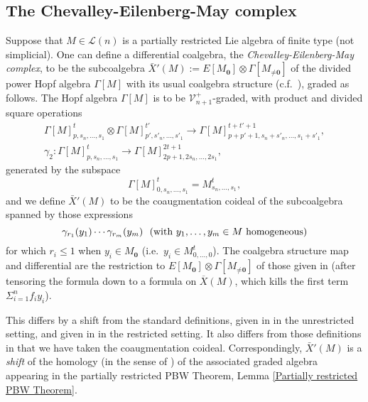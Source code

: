 \documentclass[11pt]{amsart} \renewcommand{\baselinestretch}{1.2}
\theoremstyle{plain}
\theoremstyle{definition}
\renewcommand{\to}{\longrightarrow}
\newcommand{\calL}{\mathcal{L}}
\newcommand{\calV}{\mathcal{V}}
\newcommand{\citeBOX}[2][]{\cite[\mbox{#1}]{#2}}
\newcommand{\vect}[2]{\calV^{#1}_{#2}}
\newcommand{\UEAX}{\bar{X}'}%
\begin{document}
\begin{appendices}
\subsection{The Chevalley-Eilenberg-May complex}
\label{The Chevalley-Eilenberg-May complex}
Suppose that $M\in\calL(n)$ is a partially restricted Lie algebra of finite type (not simplicial). One can define a differential coalgebra, the \emph{Chevalley-Eilenberg-May complex}, to be the subcoalgebra $\UEAX(M):= E[M_{\textbf{0}}]\otimes \Gamma[M_{\neq\textbf{0}}]$ of the divided power Hopf algebra $\Gamma[M]$ with its usual coalgebra structure (c.f.\ \citeBOX[p.~141]{MayRestLie.pdf}), graded as follows. 
The Hopf algebra $\Gamma[M]$ is to be $\vect{+}{n+1}$-graded, with product and divided square operations
\begin{gather*}
\Gamma[M]_{p,s_n,\ldots,s_1}^{t}\otimes \Gamma[M]_{p',s'_n,\ldots,s'_1}^{t'}\to \Gamma[M]_{p+p'+1,s_n+s'_n,\ldots,s_1+s'_1}^{t+t'+1},
\\
\gamma_2:\Gamma[M]_{p,s_n,\ldots,s_1}^{t}\to \Gamma[M]_{2p+1,2s_n,\ldots,2s_1}^{2t+1},
\end{gather*}
generated by the subspace
\[\Gamma[M]_{0,s_n,\ldots,s_1}^{t}=M_{s_n,\ldots,s_1}^{t},\]
and we define $\UEAX(M)$ to be the coaugmentation coideal of the subcoalgebra spanned by those expressions
\[\gamma_{r_1}(y_1)\cdots \gamma_{r_m}(y_m) \textup{\ \ (with $y_1,\ldots,y_m\in M$ homogeneous)}\]
for which  $r_i\leq1$ when $y_i\in M_{\textbf{0}}$ (i.e.\ $y_i\in M_{0,\ldots,0}^t$). The coalgebra structure map and differential are the restriction to $E[M_{\textbf{0}}]\otimes \Gamma[M_{\neq\textbf{0}}]$ of those given in \citeBOX[p.~141]{MayRestLie.pdf} (after tensoring the formula  \citeBOX[(6.19)]{MayRestLie.pdf} down to a formula on $\overline{X}(M)$, which kills the first term $\Sigma_{i=1}^nf_iy_i$).


This differs by a shift from the standard definitions, given in \cite{MR0024908} in the unrestricted setting, and  given in \cite{MayRestLie.pdf} in the  restricted setting. It also differs from those definitions in that we have taken the coaugmentation coideal.  Correspondingly, $\UEAX(M)$  is a \emph{shift} of the homology (in the sense of \cite{PriddyKoszul.pdf}) of the associated graded algebra appearing in the partially restricted PBW Theorem, Lemma \ref{Partially restricted PBW Theorem}. 


\end{appendices}
\end{document}
